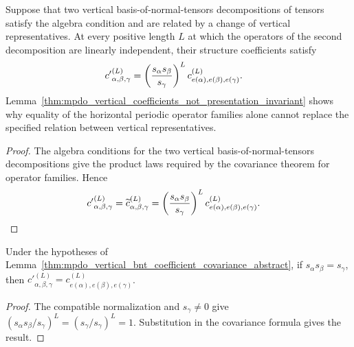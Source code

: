\begin{lemma}%
    \label{thm:mpdo_vertical_bnt_coefficient_covariance}
    \leanok
    Suppose that two vertical basis-of-normal-tensors decompositions of tensors satisfy the
    algebra condition and are related by a change of vertical representatives.
    At every positive length $L$ at which the operators of the second
    decomposition are linearly independent, their structure coefficients satisfy
    \begin{align}
        {c'}^{(L)}_{\alpha,\beta,\gamma}
         & =\left(\frac{s_\alpha s_\beta}{s_\gamma}\right)^L
        c^{(L)}_{e(\alpha),e(\beta),e(\gamma)}.
        \notag
    \end{align}
    Lemma~\ref{thm:mpdo_vertical_coefficients_not_presentation_invariant}
    shows why equality of the horizontal periodic operator families alone
    cannot replace the specified relation between vertical representatives.
\end{lemma}
\begin{proof}\leanok
    The algebra conditions for the two vertical basis-of-normal-tensors decompositions give the
    product laws required by the covariance theorem for operator families.
    Hence
    \begin{align}
        {c'}^{(L)}_{\alpha,\beta,\gamma}
         & =\widetilde c^{(L)}_{\alpha,\beta,\gamma}
        =\left(\frac{s_\alpha s_\beta}{s_\gamma}\right)^L
        c^{(L)}_{e(\alpha),e(\beta),e(\gamma)}.
        \notag
    \end{align}
\end{proof}

\begin{lemma}%
    \label{thm:mpdo_vertical_bnt_coefficient_transport_exact_abstract}
    \leanok
    Under the hypotheses of
    Lemma~\ref{thm:mpdo_vertical_bnt_coefficient_covariance_abstract}, if
    $s_\alpha s_\beta=s_\gamma$, then
    ${c'}^{(L)}_{\alpha,\beta,\gamma}
        =c^{(L)}_{e(\alpha),e(\beta),e(\gamma)}$.
\end{lemma}
\begin{proof}\leanok
    The compatible normalization and $s_\gamma\ne0$ give
    $\left(s_\alpha s_\beta/s_\gamma\right)^L
        =\left(s_\gamma/s_\gamma\right)^L=1$.
    Substitution in the covariance formula gives the result.
\end{proof}


